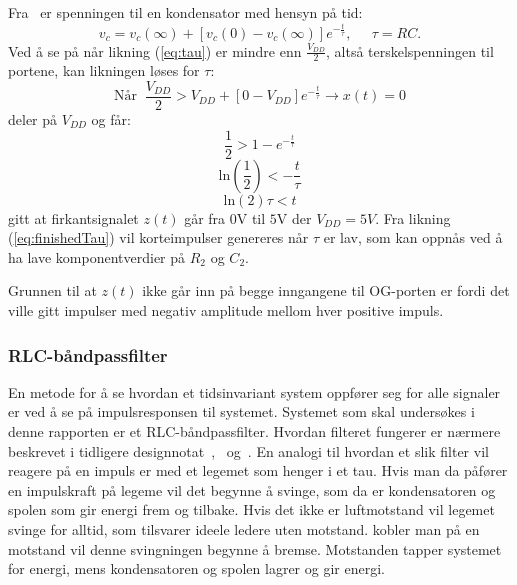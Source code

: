 \documentclass[a4paper,11pt,norsk]{article}
\begin{document}
Fra~\cite{Ert-19} er spenningen til en kondensator med hensyn på tid:
\begin{equation}
\label{eq:tau}
    v_c=v_c(\infty)+[v_c(0)-v_c(\infty)]e^{-\frac{t}{\tau}},\;\;\;\;\;  \tau=RC. 
\end{equation}
Ved å se på når likning (\ref{eq:tau}) er mindre enn $\frac{V_{DD}}{2}$, altså terskelspenningen til portene, kan likningen løses for $\tau$:
\begin{equation}
    \text{Når}\;\; \frac{V_{DD}}{2} > V_{DD}+[0-V_{DD}]e^{-\frac{t}{\tau}} \xrightarrow[]{}x(t)=0
\end{equation}
deler på $V_{DD}$ og får:
\begin{equation}
    \frac{1}{2} > 1-e^{-\frac{t}{\tau}}
\end{equation}
\begin{equation}
    \text{ln}(\frac{1}{2}) < -\frac{t}{\tau}
\end{equation}
\begin{equation}
    \label{eq:finishedTau}
    \text{ln}(2)\tau < t 
\end{equation}
gitt at firkantsignalet $z(t)$ går fra $0$V til $5$V der $V_{DD} = 5V$. Fra likning (\ref{eq:finishedTau}) vil korteimpulser genereres når $\tau$ er lav, som kan oppnås ved å ha lave komponentverdier på $R_2$ og $C_2$.

Grunnen til at $z(t)$ ikke går inn på begge inngangene til OG-porten er fordi det ville gitt impulser med negativ amplitude mellom hver positive impuls. 

\subsubsection{RLC-båndpassfilter}
\label{RCL-båndpassfilter}

En metode for å se hvordan et tidsinvariant system oppfører seg for alle signaler er ved å se på impulsresponsen til systemet. Systemet som skal undersøkes i denne rapporten er et RLC-båndpassfilter. Hvordan filteret fungerer er nærmere beskrevet i tidligere designnotat~\cite{D2},~\cite{D3} og~\cite{D4}. En analogi til hvordan et slik filter vil reagere på en impuls er med et legemet som henger i et tau. Hvis man da påfører en impulskraft på legeme vil det begynne å svinge, som da er kondensatoren og spolen som gir energi frem og tilbake. Hvis det ikke er luftmotstand vil legemet svinge for alltid, som tilsvarer ideele ledere uten motstand. kobler man på en motstand vil denne svingningen begynne å bremse. Motstanden tapper systemet for energi, mens kondensatoren og spolen lagrer og gir energi.
\end{document}
